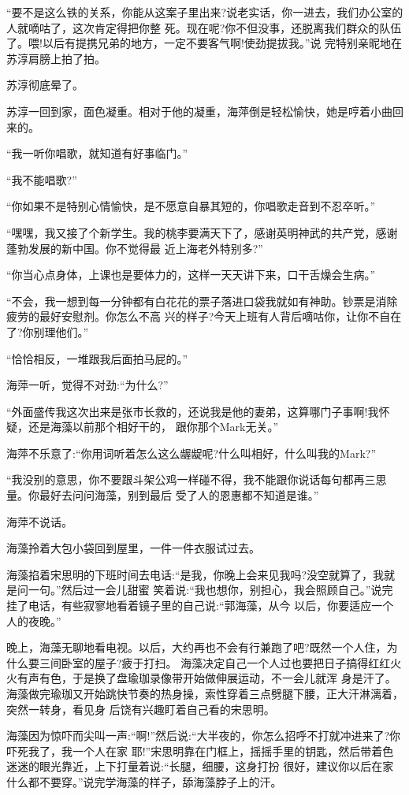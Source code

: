 \documentclass[11pt,a4paper,onecolumn]{article}
\begin{document}
``要不是这么铁的关系，你能从这案子里出来?说老实话，你一进去，我们办公室的人就嘀咕了，这次肯定得把你整
死。现在呢?你不但没事，还脱离我们群众的队伍了。喂!以后有提携兄弟的地方，一定不要客气啊!使劲提拔我。''说
完特别亲昵地在苏淳肩膀上拍了拍。

苏淳彻底晕了。

苏淳一回到家，面色凝重。相对于他的凝重，海萍倒是轻松愉快，她是哼着小曲回来的。

``我一听你唱歌，就知道有好事临门。''

``我不能唱歌?''

``你如果不是特别心情愉快，是不愿意自暴其短的，你唱歌走音到不忍卒听。''

``嘿嘿，我又接了个新学生。我的桃李要满天下了，感谢英明神武的共产党，感谢蓬勃发展的新中国。你不觉得最
近上海老外特别多?''

``你当心点身体，上课也是要体力的，这样一天天讲下来，口干舌燥会生病。''

``不会，我一想到每一分钟都有白花花的票子落进口袋我就如有神助。钞票是消除疲劳的最好安慰剂。你怎么不高
兴的样子?今天上班有人背后嘀咕你，让你不自在了?你别理他们。''

``恰恰相反，一堆跟我后面拍马屁的。''

海萍一听，觉得不对劲:``为什么?''

``外面盛传我这次出来是张市长救的，还说我是他的妻弟，这算哪门子事啊!我怀疑，还是海藻以前那个相好干的，
跟你那个Mark无关。''

海萍不乐意了:``你用词听着怎么这么龌龊呢?什么叫相好，什么叫我的Mark?''

``我没别的意思，你不要跟斗架公鸡一样碰不得，我不能跟你说话每句都再三思量。你最好去问问海藻，别到最后
受了人的恩惠都不知道是谁。''

海萍不说话。

海藻拎着大包小袋回到屋里，一件一件衣服试过去。

海藻掐着宋思明的下班时间去电话:``是我，你晚上会来见我吗?没空就算了，我就是问一句。''然后过一会儿甜蜜
笑着说:``我也想你，别担心，我会照顾自己。''说完挂了电话，有些寂寥地看着镜子里的自己说:``郭海藻，从今
以后，你要适应一个人的夜晚。''

晚上，海藻无聊地看电视。以后，大约再也不会有行兼跑了吧?既然一个人住，为什么要三间卧室的屋子?疲于打扫。
海藻决定自己一个人过也要把日子搞得红红火火有声有色，于是换了盘瑜珈录像带开始做伸展运动，不一会儿就浑
身是汗了。海藻做完瑜珈又开始跳快节奏的热身操，索性穿着三点劈腿下腰，正大汗淋漓着，突然一转身，看见身
后饶有兴趣盯着自己看的宋思明。

海藻因为惊吓而尖叫一声:``啊!''然后说:``大半夜的，你怎么招呼不打就冲进来了?你吓死我了，我一个人在家
耶!''宋思明靠在门框上，摇摇手里的钥匙，然后带着色迷迷的眼光靠近，上下打量着说:``长腿，细腰，这身打扮
很好，建议你以后在家什么都不要穿。''说完学海藻的样子，舔海藻脖子上的汗。
\end{document}
